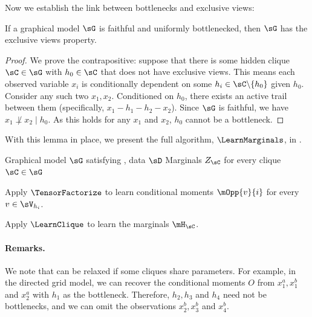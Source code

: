 Now we establish the link between bottlenecks and exclusive views:
\begin{lemma}
  \label{lem:bottleneck-views}  
  If a graphical model $\sG$ is faithful and uniformly bottlenecked, then
  $\sG$ has the exclusive views property.
\end{lemma}
\begin{proof}
We prove the contrapositive: suppose that there is some hidden clique $\sC \in \sG$ with $h_0 \in \sC$
that does not have exclusive views.  This means each observed variable $x_i$ is conditionally dependent on some
$h_i \in \sC \backslash \{h_0\}$ given $h_0$.
Consider any such two $x_1, x_2$.
Conditioned on $h_0$, there exists an active trail between them (specifically, $x_1 - h_1 - h_2 - x_2$).
Since $\sG$ is faithful, we have $x_1 \not\perp x_2 \mid h_0$.
As this holds for any $x_1$ and $x_2$, $h_0$ cannot be a bottleneck.
\end{proof}

With this lemma in place, we present the full algorithm, $\LearnMarginals$,
in .

\begin{algorithm}
  \caption{\LearnMarginals}
  \label{algo:directed}
  \begin{algorithmic}
    \REQUIRE Graphical model $\sG$ satisfying , data $\sD$
    \ENSURE Marginals $Z_\sC$ for every clique $\sC \in \sG$

        \STATE Apply $\TensorFactorize$ to learn conditional moments
        $\mOpp{v}{i}$ for every $v \in \sV_{h_i}$.

      \ENDFOR
\STATE Apply $\LearnClique$ to learn the marginals $\mH_\sC$.
\ENDFOR
  \end{algorithmic}
\end{algorithm}


\paragraph{Remarks.} We note that  can be relaxed if some cliques
  share parameters.
For example, in the directed grid model, we can recover the conditional moments $O$ from
  $x^a_1, x^b_1$ and $x^a_2$ with $h_1$ as the bottleneck.
  Therefore, $h_2, h_3$ and $h_4$
  need not be bottlenecks, and we can omit the observations $x^b_2, x^b_3$ and $x^b_4$.


